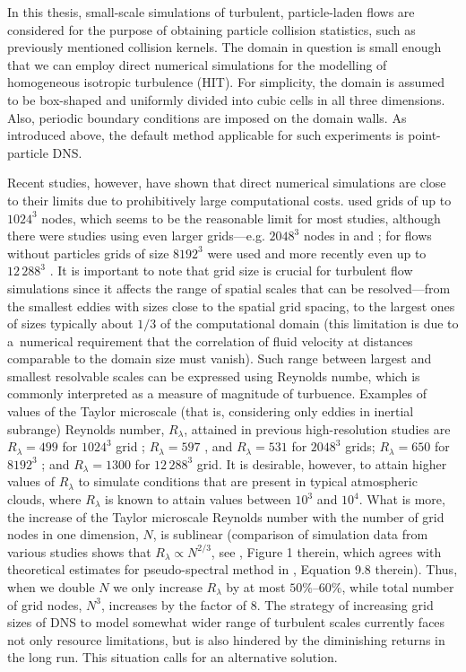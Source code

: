 \documentclass{pracamgren}
\begin{document}
\smallskip

In this thesis, small-scale simulations of turbulent, particle-laden flows are considered for the purpose of obtaining particle collision statistics, such as previously mentioned collision kernels.
The domain in question is small enough that we can employ direct numerical simulations for the modelling of homogeneous isotropic turbulence (HIT).
For simplicity, the domain is assumed to be box-shaped and uniformly divided into cubic cells in all three dimensions.
Also, periodic boundary conditions are imposed on the domain walls.
As introduced above, the default method applicable for such experiments is point-particle DNS.

Recent studies, however, have shown that direct numerical simulations are close to their limits due to prohibitively large computational costs.
\textcite{Rosa2013,Rosa2016} used grids of up to $1024^3$ nodes, which seems to be the reasonable limit for most studies, although there were studies using even larger grids---e.g. $2048^3$ nodes in \textcite{Ireland2016} and \textcite{Matsuda2021}; for flows without particles grids of size $8192^3$ were used \parencite{Buaria2019} and more recently even up to $12\,288^{3}$ \parencite{Buaria2020}.
It is important to note that grid size is crucial for turbulent flow simulations since it affects the range of spatial scales that can be resolved---from the smallest eddies with sizes close to the spatial grid spacing, to the largest ones of sizes typically about $1/3$ of the computational domain (this limitation is due to a~numerical requirement that the correlation of fluid velocity at distances comparable to the domain size must vanish).
Such range between largest and smallest resolvable scales can be expressed using Reynolds numbe, which is commonly interpreted as a measure of magnitude of turbuence.
Examples of values of the Taylor microscale (that is, considering only eddies in inertial subrange) Reynolds number, $R_{\lambda}$, attained in previous high-resolution studies are $R_{\lambda} = 499$ for $1024^3$ grid \parencite{Rosa2013,Rosa2016}; $R_{\lambda} = 597$ \parencite{Ireland2016}, and $R_{\lambda} = 531$ \parencite{Matsuda2021} for $2048^3$ grids; $R_{\lambda} = 650$ for $8192^3$ \parencite{Buaria2019}; and $R_{\lambda} = 1300$ for $12\,288^3$ grid.
It is desirable, however, to attain higher values of $R_{\lambda}$ to simulate conditions that are present in typical atmospheric clouds, where $R_{\lambda}$ is known to attain values between $10^{3}$ and $10^{4}$.
What is more, the increase of the Taylor microscale Reynolds number with the number of grid nodes in one dimension, $N$, is sublinear (comparison of simulation data from various studies shows that $R_{\lambda} \propto N^{2/3}$, see \cite{Wang2009}, Figure 1 therein, which agrees with theoretical estimates for pseudo-spectral method in \cite{Pope2000}, Equation 9.8 therein).
Thus, when we double $N$ we only increase $R_{\lambda}$ by at most $50\% \text{--} 60\%$, while total number of grid nodes, $N^3$, increases by the factor of $8$.
The strategy of increasing grid sizes of DNS to model somewhat wider range of turbulent scales currently faces not only resource limitations, but is also hindered by the diminishing returns in the long run.
This situation calls for an alternative solution.
\end{document}
